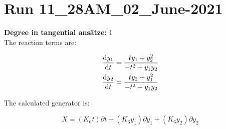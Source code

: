 \section*{Run 11\_28AM\_02\_June-2021}
\textbf{Degree in tangential ansätze:}	1\\
The reaction terms are:

\begin{align*}
\dv{y_{1}}{t}&=\frac{t y_{1} + y_{2}^{2}}{- t^{2} + y_{1} y_{2}}\\
\dv{y_{2}}{t}&=\frac{t y_{2} + y_{1}^{2}}{- t^{2} + y_{1} y_{2}}\\
\end{align*}

The calculated generator is:

\begin{equation}X=\left(K_{6} t\right)\partial t+\left(K_{6} y_{1}\right)\partial y_{1}+\left(K_{6} y_{2}\right)\partial y_{2}\end{equation}
